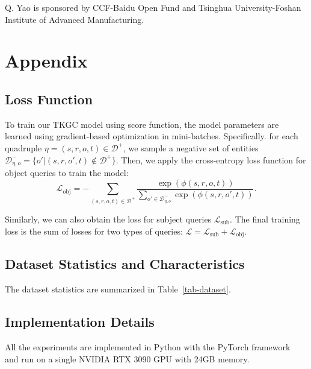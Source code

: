 \documentclass[11pt]{article}
\begin{document}
Q. Yao is sponsored by CCF-Baidu Open Fund and Tsinghua University-Foshan Institute of Advanced Manufacturing.



\appendix

\section{Appendix}
\label{sec:appendix}

\subsection{Loss Function}
\label{sec:appendix-loss}

To train our TKGC model using score function, 
the model parameters are learned 
using gradient-based optimization in mini-batches.
Specifically.
for each quadruple $\eta = (s, r, o, t) \in \mathcal{D}^{+}$,
we sample a negative set of entities $\mathcal{D}^{-}_{\eta, o} = \{o' | (s, r, o', t) \not\in \mathcal{D}^{+}\}$.
Then,
we apply the cross-entropy loss function for object queries to train the model:
\begin{equation}\label{equ-loss_obj}
	\mathcal{L}_{\text{obj}} = - \sum_{(s,r,o,t) \in \mathcal{D}^{+}}\frac{\exp(\phi(s, r, o, t))}{\sum_{o' \in \mathcal{D}^{-}_{\eta, o}} \exp(\phi(s, r, o', t))}.
\end{equation}

Similarly, 
we can also obtain the loss for subject queries $\mathcal{L}_{\text{sub}}$. 
The final training loss is the sum of losses for two types of queries: $\mathcal{L} = \mathcal{L}_{\text{sub}} + \mathcal{L}_{\text{obj}}$.

\subsection{Dataset Statistics and Characteristics}
\label{sec:appendix-dataset}

The dataset statistics are summarized in Table~\ref{tab-dataset}.

\subsection{Implementation Details}
\label{sec:appendix-impl}

All the experiments are implemented in Python with the PyTorch framework~\citep{paszke2019pytorch} and run on a single NVIDIA RTX 3090 GPU with 24GB memory.
\end{document}
